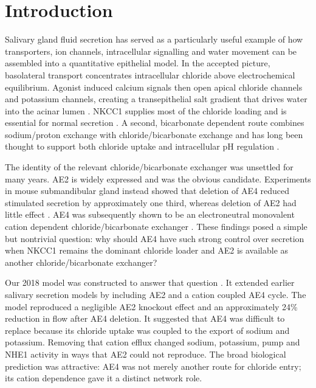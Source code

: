 \section{Introduction}
\label{sec:introduction}

Salivary gland fluid secretion has served as a particularly useful example of how transporters, ion channels, intracellular signalling and water movement can be assembled into a quantitative epithelial model. In the accepted picture, basolateral transport concentrates intracellular chloride above electrochemical equilibrium. Agonist induced calcium signals then open apical chloride channels and potassium channels, creating a transepithelial salt gradient that drives water into the acinar lumen \citep{Melvin2005,Frizzell2012}. NKCC1 supplies most of the chloride loading and is essential for normal secretion \citep{Evans2000}. A second, bicarbonate dependent route combines sodium/proton exchange with chloride/bicarbonate exchange and has long been thought to support both chloride uptake and intracellular pH regulation \citep{Nauntofte1992,Melvin2005}.

The identity of the relevant chloride/bicarbonate exchanger was unsettled for many years. AE2 is widely expressed and was the obvious candidate. Experiments in mouse submandibular gland instead showed that deletion of AE4 reduced stimulated secretion by approximately one third, whereas deletion of AE2 had little effect \citep{PenaMunzenmayer2015}. AE4 was subsequently shown to be an electroneutral monovalent cation dependent chloride/bicarbonate exchanger \citep{PenaMunzenmayer2016}. These findings posed a simple but nontrivial question: why should AE4 have such strong control over secretion when NKCC1 remains the dominant chloride loader and AE2 is available as another chloride/bicarbonate exchanger?

Our 2018 model was constructed to answer that question \citep{VeraSiguenza2018}. It extended earlier salivary secretion models \citep{Gin2007,Palk2010,Maclaren2012} by including AE2 and a cation coupled AE4 cycle. The model reproduced a negligible AE2 knockout effect and an approximately 24\% reduction in flow after AE4 deletion. It suggested that AE4 was difficult to replace because its chloride uptake was coupled to the export of sodium and potassium. Removing that cation efflux changed sodium, potassium, pump and NHE1 activity in ways that AE2 could not reproduce. The broad biological prediction was attractive: AE4 was not merely another route for chloride entry; its cation dependence gave it a distinct network role.

